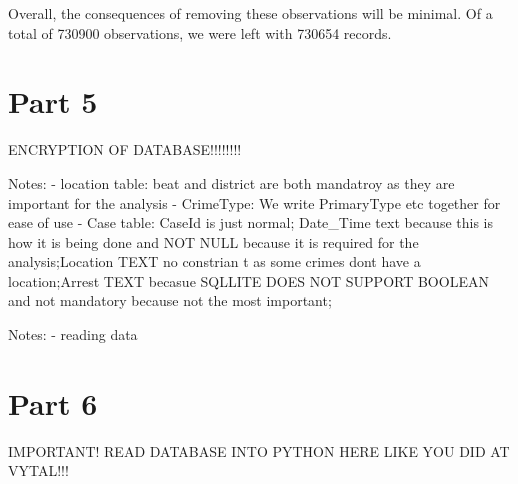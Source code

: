 \documentclass[a4paper]{article}
\begin{document}
Overall, the consequences of removing these observations will be minimal. Of a total of 730900 observations, we were left with 730654 records. 




\section{Part 5}
ENCRYPTION OF DATABASE!!!!!!!!

Notes:
- location table: beat and district are both mandatroy as they are important for the analysis
- CrimeType: We write PrimaryType etc together for ease of use
- Case table: CaseId is just normal; Date_Time text because this is how it is being done and NOT NULL because it is required for the analysis;Location TEXT no constrian t as some crimes dont have a location;Arrest TEXT becasue SQLLITE DOES NOT SUPPORT BOOLEAN and not mandatory because not the most important;

Notes:
- reading data


\section{Part 6}
IMPORTANT! READ DATABASE INTO PYTHON HERE LIKE YOU DID AT VYTAL!!!
\end{document}
